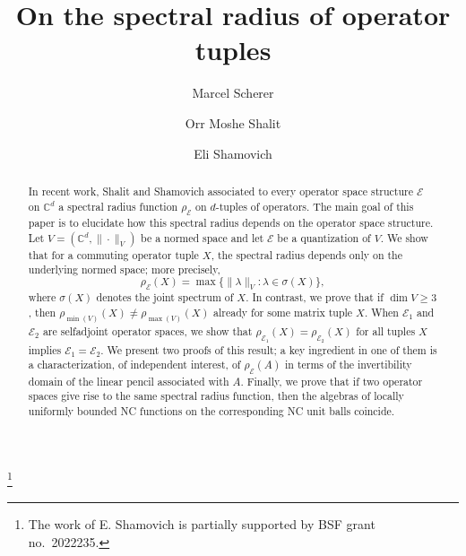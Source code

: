 \documentclass[12pt]{amsart}
\numberwithin{equation}{section}
\theoremstyle{definition}
\newcommand{\cE}{\mathcal{E}}
\newcommand{\bC}{\mathbb{C}}
\begin{document}
\title{On the spectral radius of operator tuples}


\author{Marcel Scherer}
 \address{M.S., Faculty of Mathematics\\
 Technion Israel Institute of Technology\\
 Technion City, Haifa\\
 Israel}
 
 
 \author{Orr Moshe Shalit}
 \address{O.M.S., Faculty of Mathematics 
 \\The Helen Diller Quantum Center
 \\Technion Israel Institute of Technology\\
 Technion City, Haifa\\
 Israel}
 


 \author{Eli Shamovich}
 \address{E.S., Department of Mathematics\\
 Ben-Gurion University of the Negev\\
 Beer-Seva\\
 Israel}





 \thanks{The work of E. Shamovich is partially supported by BSF grant no.\ 2022235.}
 


\begin{abstract}
In recent work, Shalit and Shamovich associated to every operator space structure $\cE$ on $\bC^d$ a spectral radius function $\rho_\cE$ on $d$-tuples of operators. 
The main goal of this paper is to elucidate how this spectral radius depends on the operator space structure. 
Let $V = (\bC^d, \|\cdot\|_V)$ be a normed space and let $\cE$ be a quantization of $V$. 
We show that for a commuting operator tuple $X$, the spectral radius depends only on the underlying normed space; more precisely, 
\[
\rho_\cE(X) = \max\{ \|\lambda\|_V : \lambda \in \sigma(X)\}, 
\]
where $\sigma(X)$ denotes the joint spectrum of $X$.
In contrast, we prove that if $\dim V \geq 3$, then $\rho_{\min(V)}(X) \neq \rho_{\max(V)}(X)$ already for some matrix tuple $X$. 
When $\cE_1$ and $\cE_2$ are selfadjoint operator spaces, we show that $\rho_{\cE_1}(X) = \rho_{\cE_2}(X)$ for all tuples $X$ implies $\cE_1 = \cE_2$. 
We present two proofs of this result; a key ingredient in one of them is a characterization, of independent interest, of $\rho_\cE(A)$ in terms of the invertibility domain of the linear pencil associated with $A$. 
Finally, we prove that if two operator spaces give rise to the same spectral radius function, then the algebras of locally uniformly bounded NC functions on the corresponding NC unit balls coincide.  
\end{abstract}
\end{document}
